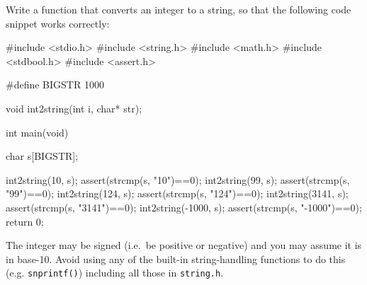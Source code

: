 
\begin{exercise}
Write a function that converts an integer
to a string, so that the following code snippet
works correctly:

\begin{codesnippet}
#include <stdio.h>
#include <string.h>
#include <math.h>
#include <stdbool.h>
#include <assert.h>

#define BIGSTR 1000

void int2string(int i, char* str);

int main(void)
{
   char s[BIGSTR];

   int2string(10, s);
   assert(strcmp(s, "10")==0);
   int2string(99, s);
   assert(strcmp(s, "99")==0);
   int2string(124, s);
   assert(strcmp(s, "124")==0);
   int2string(3141, s);
   assert(strcmp(s, "3141")==0);
   int2string(-1000, s);
   assert(strcmp(s, "-1000")==0);
   return 0;
}
\end{codesnippet}

The integer may be signed (i.e.\ be positive or negative)
and you may assume it is in base-10.
Avoid using any of the built-in string-handling functions
to do this (e.g. \verb^snprintf()^)
including all those in \verb^string.h^.
\end{exercise}

